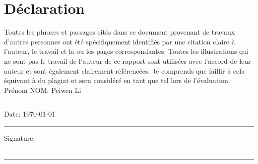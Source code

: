 

\section*{\Large Déclaration}

Toutes les phrases et passages cités dans ce document provenant de travaux d'autres personnes ont été spécifiquement identifiés par une citation claire à l'auteur, le travail et la ou les pages correspondantes.
Toutes les illustrations qui ne sont pas le travail de l'auteur de ce rapport sont utilisées avec l'accord de leur auteur et sont également clairement référencées. Je comprends que faillir à cela équivaut à du plagiat et sera considéré en tant que tel lors de l'évaluation.\\[1cm]

\noindent Prénom NOM: Peiwen Li\\[1mm]
\rule[1em]{25em}{0.5pt}

\noindent Date: \today \\[1mm]
\rule[1em]{25em}{0.5pt}

\noindent Signature:\\[1mm]
\\
\rule[1em]{25em}{0.5pt}